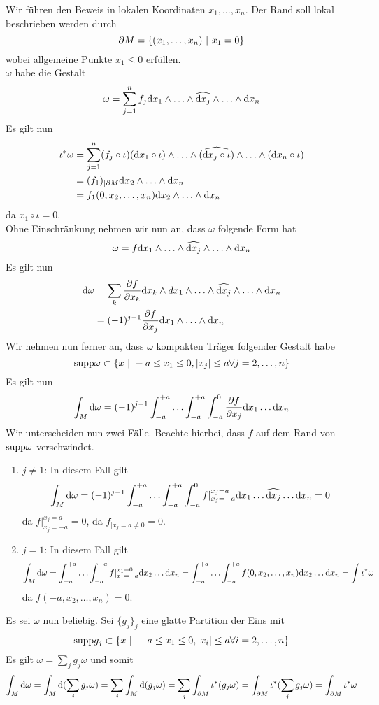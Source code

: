 \begin{Beweis}{}
Wir führen den Beweis in lokalen Koordinaten $x_1, \ldots, x_n$. Der Rand soll lokal beschrieben werden durch
\[ \partial M = \set{ (x_1,\ldots, x_n) }{ x_1 = 0 } \]
wobei allgemeine Punkte $x_1 \leq 0$ erfüllen.\\
$\omega$ habe die Gestalt
\[ \omega = \sum_{j = 1}^n f_j \text{d} x_1 \wedge \ldots \wedge \widehat{\text{d} x_j} \wedge \ldots \wedge \text{d} x_n  \]
Es gilt nun
\begin{align*}
\iota^*\omega &= \sum_{j = 1}^n (f_j \circ \iota) (\text{d}  x_1 \circ \iota) \wedge \ldots \wedge \widehat{(\text{d} x_j\circ \iota)} \wedge \ldots \wedge (\text{d} x_n\circ \iota) \\
&= (f_1)_{|\partial M} \text{d} x_2 \wedge \ldots \wedge \text{d} x_n \\
&= f_1(0, x_2, \ldots, x_n) \text{d} x_2 \wedge \ldots \wedge \text{d} x_n
\end{align*}
da $x_1 \circ \iota = 0$.\\
Ohne Einschränkung nehmen wir nun an, dass $\omega$ folgende Form hat
\[ \omega = f \text{d} x_1 \wedge \ldots \wedge \widehat{\text{d} x_j} \wedge \ldots \wedge \text{d} x_n  \]
Es gilt nun
\begin{align*}
\text{d} \omega &= \sum_k \frac{\partial f}{\partial x_k} \text{d} x_k \wedge d x_1 \wedge \ldots \wedge \widehat{\text{d} x_j} \wedge \ldots \wedge \text{d} x_n\\
 &= (-1)^{j-1} \frac{\partial f}{\partial x_j} \text{d} x_1 \wedge \ldots \wedge \text{d} x_n
\end{align*}
Wir nehmen nun ferner an, dass $\omega$ kompakten Träger folgender Gestalt habe
\[ \supp \omega \subset \set{x}{-a \leq x_1 \leq 0, \bet{x_j}\leq a \forall j = 2,\ldots,n} \] 
Es gilt nun
\[ \int_M \text{d} \omega = (-1)^{j-1} \int_{-a}^{+a} \ldots \int_{-a}^{+a} \int_{-a}^{0} \frac{\partial f}{\partial x_j} \text{d} x_1 \ldots \text{d} x_n \]
Wir unterscheiden nun zwei Fälle. Beachte hierbei, dass $f$ auf dem Rand von $\text{supp} \omega$ verschwindet.
\begin{enumerate}
	\item $j\neq 1$: In diesem Fall gilt
	\[ \int_M \text{d} \omega = (-1)^{j-1} \int_{-a}^{+a} \ldots \int_{-a}^{+a} \int_{-a}^{0} f|_{x_j = -a}^{x_j = a} \text{d} x_1 \ldots \widehat{\text{d} x_j} \ldots \text{d} x_n = 0  \]
	da $f|_{x_j = -a}^{x_j = a} = 0$, da $f_{| x_j = a \neq 0} = 0$.
	\item $j= 1$: In diesem Fall gilt
	\[ \int_M \text{d} \omega = \int_{-a}^{+a} \ldots \int_{-a}^{+a} f|_{x_1 = -a}^{x_1 = 0} \text{d} x_2 \ldots \text{d} x_n = 
	  \int_{-a}^{+a} \ldots \int_{-a}^{+a} f(0, x_2, \ldots, x_n) \text{d} x_2 \ldots \text{d} x_n = \int \iota^*\omega  \]
	da $f(-a, x_2, \ldots, x_n) = 0$.
\end{enumerate}
Es sei $\omega$ nun beliebig. Sei $\{g_j\}_j$ eine glatte Partition der Eins mit
\[ \text{supp} g_j \subset \{ x~|~ -a \leq x_1 \leq 0, \left|x_i\right|\leq a \forall i = 2, \ldots, n \} \]
Es gilt $\omega = \sum_j g_j \omega$ und somit
\[ \int_M \text{d} \omega = 
\int_M \text{d} (\sum_j g_j \omega) = \sum_j  \int_M \text{d} (g_j \omega) = \sum_{j} \int_{\partial M} \iota^*(g_j\omega) = \int_{\partial M}\iota^*(\sum_{j} g_j \omega) = \int_{\partial M} \iota^*\omega \]
\end{Beweis}

